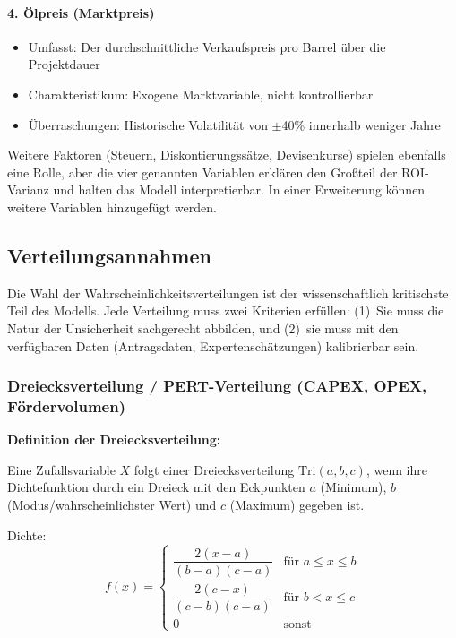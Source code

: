 \documentclass[11pt,a4paper]{article}
\begin{document}
\paragraph{4. Ölpreis (Marktpreis)}
\begin{itemize}[itemsep=1pt]
  \item Umfasst: Der durchschnittliche Verkaufspreis pro Barrel über die Projektdauer
  \item Charakteristikum: Exogene Marktvariable, nicht kontrollierbar
  \item Überraschungen: Historische Volatilität von $\pm$40\% \cite{leonteq2023} innerhalb weniger Jahre 
\end{itemize}

Weitere Faktoren (Steuern, Diskontierungssätze, Devisenkurse) spielen ebenfalls eine Rolle, aber die vier genannten Variablen erklären den Großteil der ROI-Varianz und halten das Modell interpretierbar. In einer Erweiterung können weitere Variablen hinzugefügt werden.

\subsection{Verteilungsannahmen}

Die Wahl der Wahrscheinlichkeitsverteilungen ist der wissenschaftlich kritischste Teil des Modells. Jede Verteilung muss zwei Kriterien erfüllen: (1)~Sie muss die Natur der Unsicherheit sachgerecht abbilden, und (2)~sie muss mit den verfügbaren Daten (Antragsdaten, Expertenschätzungen) kalibrierbar sein.

\subsubsection{Dreiecksverteilung / PERT-Verteilung (CAPEX, OPEX, Fördervolumen)}

\textbf{Definition der Dreiecksverteilung:}

Eine Zufallsvariable $X$ folgt einer Dreiecksverteilung $\text{Tri}(a, b, c)$, wenn ihre Dichtefunktion durch ein Dreieck mit den Eckpunkten $a$ (Minimum), $b$ (Modus/wahrscheinlichster Wert) und $c$ (Maximum) gegeben ist.

Dichte:
\begin{equation}
f(x) = \begin{cases}
  \dfrac{2(x-a)}{(b-a)(c-a)} & \text{für } a \leq x \leq b \\[8pt]
  \dfrac{2(c-x)}{(c-b)(c-a)} & \text{für } b < x \leq c \\[4pt]
  0 & \text{sonst}
\end{cases}
\end{equation}
\end{document}
